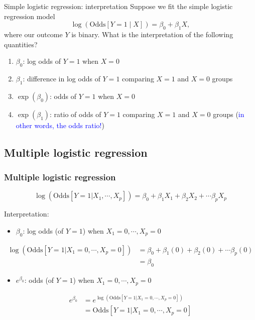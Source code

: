 \documentclass[10pt,t]{beamer}
\begin{document}
\begin{frame}{Simple logistic regression: interpretation}
	Suppose we fit the simple logistic regression model $$\log\left(\text{Odds}[Y =1 \mid X]\right) = \beta_0 + \beta_1 X,$$ where our outcome $Y$ is binary. What is the interpretation of the following quantities?
	\begin{enumerate}
		\item $\beta_0$: log odds of $Y = 1$ when $X = 0$ \pause
		\item $\beta_1$: difference in log odds of $Y = 1$ comparing $X = 1$ and $X =0$ groups \pause
		\item $\exp(\beta_0)$: odds of $Y = 1$ when $X = 0$ \pause
		\item $\exp(\beta_1)$: ratio of odds of $Y = 1$ comparing $X = 1$ and $X = 0$ groups (\textcolor{blue}{in other words, the odds ratio!})
	\end{enumerate} 
\end{frame}

\subsection{Multiple logistic regression}
\begin{frame}
	\frametitle{Multiple logistic regression}
	\vspace{-1.5cm}
	$$\log\left(\text{Odds}[Y =1 |X_1,\cdots,X_p]\right) = \beta_0 + \beta_1 X_1 + \beta_2X_2 + \cdots \beta_p X_p$$
	
	\color{blue} Interpretation: \color{black}
	\begin{itemize}  \color{red}
		\item $\beta_0$: \pause log odds (of $Y=1$) when $X_1 = 0, \cdots, X_p = 0$ \pause
	\end{itemize}
	\vspace{-0.3cm}
	\begin{footnotesize}
		\begin{align*}
			\log\left(\text{Odds}[Y =1 |X_1=0,\cdots,X_p=0]\right) & = \beta_0 + \beta_1 (0) + \beta_2(0) + \cdots \beta_p (0) \\
			& = \beta_0 
		\end{align*} \pause
	\end{footnotesize}
	
	\vspace{-0.6cm}
	\begin{itemize}   \color{red}
		\item $e^{\beta_0}$: \pause odds (of $Y=1$) when $X_1 = 0, \cdots, X_p = 0$ \pause
	\end{itemize}
	\vspace{-0.3cm}
	\begin{footnotesize}
		\begin{align*}
			e^{\beta_0} & = e^{\log\left(\text{Odds}[Y =1 |X_1=0,\cdots,X_p=0]\right)} \\
			& = \text{Odds}[Y =1 |X_1=0,\cdots,X_p=0]
		\end{align*}
	\end{footnotesize}
\end{frame}
\end{document}
